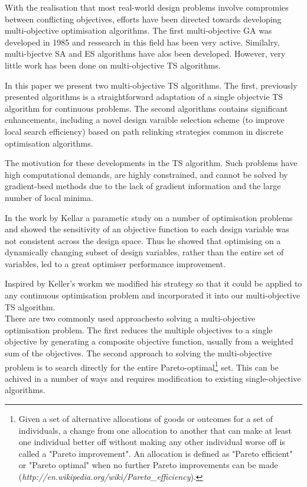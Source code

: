 \documentclass[pdftex,11pt]{article}
\begin{document}
With the realisation that most real-world design problems involve compromies between conflicting objectives, efforts have been directed towards developing multi-objective optimisation algorithms. The first multi-objective GA was developed in 1985 and ressearch in this field has been very active. Similalry, multi-bjectve SA and ES algorithms have alos been developed. However, very little work has been done on multi-objective TS algorithms.

In this paper we present two multi-objective TS algorithms. The first, previously presented algorithms is a straightforward adaptation of a single objectvie TS algorithm for continuous problems. The second algorithms contains significant enhancements, including a novel design varaible selection scheme (to improve local search efficiency) based on path relinking strategies common in discrete optimisation algorithms.

The motivation for these developments in the TS algorithm. Such problems have high computational demands, are highly constrained, and cannot be solved by gradient-bsed methods due to the lack of gradient information and the large number of local minima.

In the work by Kellar a parametic study on a number of optimisation problems and showed the sensitivity of an objective function to each design variable was not consistent across the design space. Thus he showed that optimising on a dynamically changing subset of design variables, rather than the entire set of variables, led to a great optimiser performance improvement.

Inspired by Keller's workm we modified his strategy so that it could be applied to any continuous optimisation problem and incorporated it into our multi-objective TS algorithm.\\

There are two commonly used approachesto solving a multi-objective optimisation problem. The first reduces the multiple objectives to a single objective by generating a composite objective function, usually from a weighted sum of the objectives. The second approach to solving the multi-objective problem is to search directly for the entire Pareto-optimal\footnote{Given a set of alternative allocations of goods or outcomes for a set of individuals, a change from one allocation to another that can make at least one individual better off without making any other individual worse off is called a "Pareto improvement". An allocation is defined as "Pareto efficient" or "Pareto optimal" when no further Pareto improvements can be made (\emph{http://en.wikipedia.org/wiki/Pareto{\_}efficiency}).} set. This can be achived in a number of ways and requires modification to existing single-objective algorithms.
\end{document}
